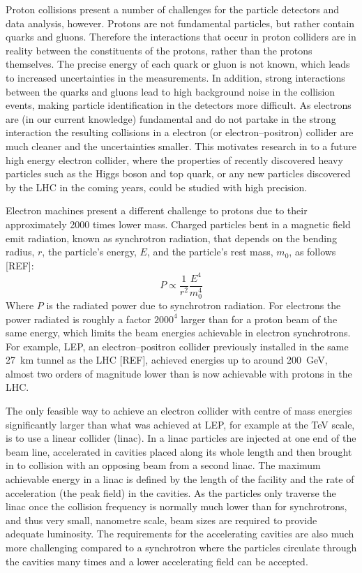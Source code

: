 Proton collisions present a number of challenges for the particle detectors and data analysis, however. Protons are not fundamental particles, but rather contain quarks and gluons. Therefore the interactions that occur in proton colliders are in reality between the constituents of the protons, rather than the protons themselves. The precise energy of each quark or gluon is not known, which leads to increased uncertainties in the measurements. In addition, strong interactions between the quarks and gluons lead to high background noise in the collision events, making particle identification in the detectors more difficult. As electrons are (in our current knowledge) fundamental and do not partake in the strong interaction the resulting collisions in a electron (or electron--positron) collider are much cleaner and the uncertainties smaller. This motivates research in to a future high energy electron collider, where the properties of recently discovered heavy particles such as the Higgs boson and top quark, or any new particles discovered by the LHC in the coming years, could be studied with high precision. 

Electron machines present a different challenge to protons due to their approximately 2000 times lower mass. Charged particles bent in a magnetic field emit radiation, known as synchrotron radiation, that depends on the bending radius, \(r\), the particle's energy, \(E\), and the particle's rest mass, \(m_0\), as follows [REF]:
\begin{equation}
P \propto \frac{1}{r^2} \frac{E^4}{m_0^4}
\end{equation}
Where \(P\) is the radiated power due to synchrotron radiation. For electrons the power radiated is roughly a factor \(2000^4\) larger than for a proton beam of the same energy, which limits the beam energies achievable in electron synchrotrons. For example, LEP, an electron--positron collider previously installed in the same 27~km tunnel as the LHC [REF], achieved energies up to around 200~GeV, almost two orders of magnitude lower than is now achievable with protons in the LHC.

The only feasible way to achieve an electron collider with centre of mass energies significantly larger than what was achieved at LEP, for example at the TeV scale, is to use a linear collider (linac). In a linac particles are injected at one end of the beam line, accelerated in cavities placed along its whole length and then brought in to collision with an opposing beam from a second linac. The maximum achievable energy in a linac is defined by the length of the facility and the rate of acceleration (the peak field) in the cavities. As the particles only traverse the linac once the collision frequency is normally much lower than for synchrotrons, and thus very small, nanometre scale, beam sizes are required to provide adequate luminosity. The requirements for the accelerating cavities are also much more challenging compared to a synchrotron where the particles circulate through the cavities many times and a lower accelerating field can be accepted.

